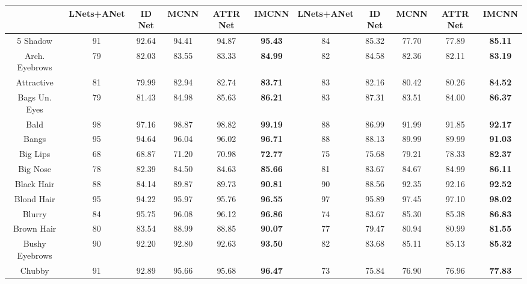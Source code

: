 \documentclass[wcp]{jmlr}
\begin{document}
	\begin{table}
		\tiny
		\begin{center}
			\renewcommand\arraystretch{1.8}
			\begin{tabular}{c|c|c|c|c|c||c|c|c|c|c|}
				\hline
				& LNets+ANet & ID Net & MCNN & ATTR Net & IMCNN & LNets+ANet & ID Net & MCNN & ATTR Net & IMCNN \\
				\hline
				5 Shadow & 91 & 92.64 & 94.41 & 94.87 & \textbf{95.43} & 84 & 85.32 & 77.70 & 77.89 & \textbf{85.11} \\
				\hline
				Arch. Eyebrows & 79 & 82.03 & 83.55 & 83.33 & \textbf{84.99} & 82 & 84.58 & 82.36 & 82.11 & \textbf{83.19} \\
				\hline
				Attractive & 81 & 79.99 & 82.94 & 82.74 & \textbf{83.71} & 83 & 82.16 & 80.42 & 80.26 & \textbf{84.52} \\
				\hline
				Bags Un. Eyes & 79 & 81.43 & 84.98 & 85.63 & \textbf{86.21} & 83 & 87.31 & 83.51 & 84.00 & \textbf{86.37} \\
				\hline
				Bald & 98 & 97.16 & 98.87 & 98.82 & \textbf{99.19} & 88 & 86.99 & 91.99 & 91.85 & \textbf{92.17} \\
				\hline
				Bangs & 95 & 94.64 & 96.04 & 96.02 & \textbf{96.71} & 88 & 88.13 & 89.99 & 89.99 & \textbf{91.03} \\
				\hline
				Big Lips & 68 & 68.87 & 71.20 & 70.98 & \textbf{72.77} & 75 & 75.68 & 79.21 & 78.33 & \textbf{82.37} \\
				\hline
				Big Nose & 78 & 82.39 & 84.50 & 84.63 & \textbf{85.66} & 81 & 83.67 & 84.67 & 84.99 & \textbf{86.11} \\
				\hline
				Black Hair & 88 & 84.14 & 89.87 & 89.73 & \textbf{90.81} & 90 & 88.56 & 92.35 & 92.16 & \textbf{92.52} \\
				\hline
				Blond Hair & 95 & 94.22 & 95.97 & 95.76 & \textbf{96.55} & 97 & 95.89 & 97.45 & 97.10 & \textbf{98.02} \\
				\hline
				Blurry & 84 & 95.75 & 96.08 & 96.12 & \textbf{96.86} & 74 & 83.67 & 85.30 & 85.38 & \textbf{86.83} \\
				\hline
				Brown Hair & 80 & 83.54 & 88.99 & 88.85 & \textbf{90.07} & 77 & 79.47 & 80.94 & 80.99 & \textbf{81.55} \\
				\hline
				Bushy Eyebrows & 90 & 92.20 & 92.80 & 92.63 & \textbf{93.50} & 82 & 83.68 & 85.11 & 85.13 & \textbf{85.32} \\
				\hline
				Chubby & 91 & 92.89 & 95.66 & 95.68 & \textbf{96.47} & 73 & 75.84 & 76.90 & 76.96 & \textbf{77.83} \\

\end{tabular}
\end{center}
\end{table}
\end{document}
